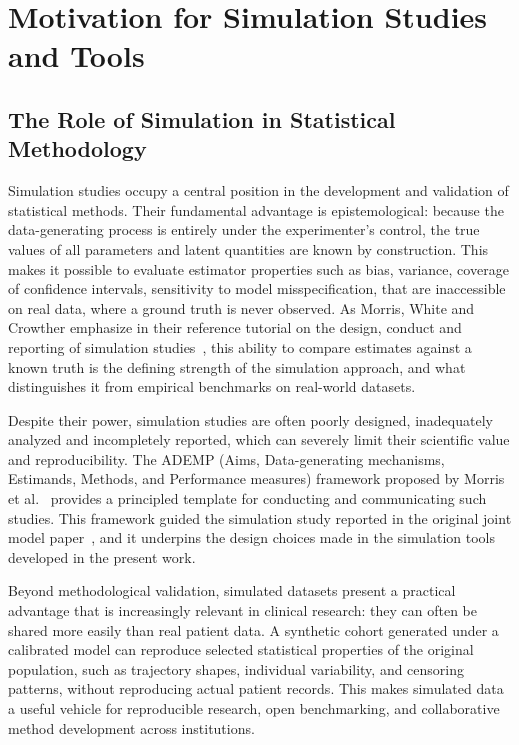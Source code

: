 \documentclass{rapportCS}
\begin{document}
\newpage

\section{Motivation for Simulation Studies and Tools}

\subsection{The Role of Simulation in Statistical Methodology}

Simulation studies occupy a central position in the development and validation of statistical methods. Their fundamental advantage is epistemological: because the data-generating process is entirely under the experimenter's control, the true values of all parameters and latent quantities are known by construction. This makes it possible to evaluate estimator properties such as bias, variance, coverage of confidence intervals, sensitivity to model misspecification, that are inaccessible on real data, where a ground truth is never observed. As Morris, White and Crowther emphasize in their reference tutorial on the design, conduct and reporting of simulation studies~\cite{morris2019using}, this ability to compare estimates against a known truth is the defining strength of the simulation approach, and what distinguishes it from empirical benchmarks on real-world datasets.

Despite their power, simulation studies are often poorly designed, inadequately analyzed and incompletely reported, which can severely limit their scientific value and reproducibility. The ADEMP (Aims, Data-generating mechanisms, Estimands, Methods, and Performance measures) framework proposed by Morris et al.~\cite{morris2019using} provides a principled template for conducting and communicating such studies. This framework guided the simulation study reported in the original joint model paper~\cite{ortholand2026joint}, and it underpins the design choices made in the simulation tools developed in the present work.

Beyond methodological validation, simulated datasets present a practical advantage that is increasingly relevant in clinical research: they can often be shared more easily than real patient data. A synthetic cohort generated under a calibrated model can reproduce selected statistical properties of the original population, such as trajectory shapes, individual variability, and censoring patterns, without reproducing actual patient records. This makes simulated data a useful vehicle for reproducible research, open benchmarking, and collaborative method development across institutions.
\end{document}
